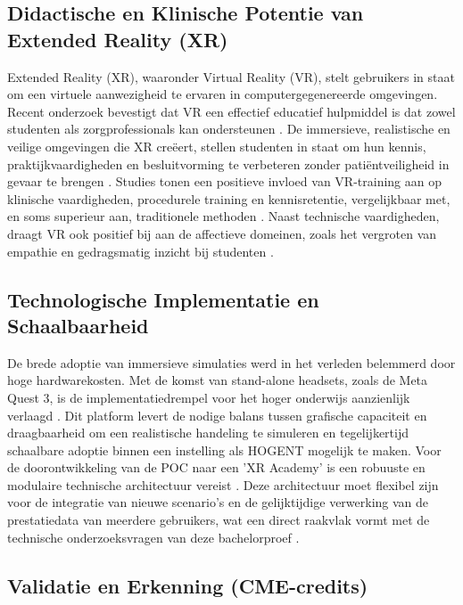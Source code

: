 \subsection{Didactische en Klinische Potentie van Extended Reality (XR)}

Extended Reality (XR), waaronder Virtual Reality (VR), stelt gebruikers in staat om een virtuele aanwezigheid te ervaren in computergegenereerde omgevingen. Recent onderzoek bevestigt dat VR een effectief educatief hulpmiddel is dat zowel studenten als zorgprofessionals kan ondersteunen \autocite{Lampropoulos2025}. De immersieve, realistische en veilige omgevingen die XR creëert, stellen studenten in staat om hun kennis, praktijkvaardigheden en besluitvorming te verbeteren zonder patiëntveiligheid in gevaar te brengen \autocite{Lampropoulos2025}. Studies tonen een positieve invloed van VR-training aan op klinische vaardigheden, procedurele training en kennisretentie, vergelijkbaar met, en soms superieur aan, traditionele methoden \autocite{Kyaw2019}. Naast technische vaardigheden, draagt VR ook positief bij aan de affectieve domeinen, zoals het vergroten van empathie en gedragsmatig inzicht bij studenten \autocite{Lampropoulos2025}. 

\subsection{Technologische Implementatie en Schaalbaarheid}

De brede adoptie van immersieve simulaties werd in het verleden belemmerd door hoge hardwarekosten. Met de komst van stand-alone headsets, zoals de Meta Quest 3, is de implementatiedrempel voor het hoger onderwijs aanzienlijk verlaagd \autocite{Pottle2019}. Dit platform levert de nodige balans tussen grafische capaciteit en draagbaarheid om een realistische handeling te simuleren en tegelijkertijd schaalbare adoptie binnen een instelling als HOGENT mogelijk te maken. Voor de doorontwikkeling van de POC naar een 'XR Academy' is een robuuste en modulaire technische architectuur vereist \autocite{Radianti2020}. Deze architectuur moet flexibel zijn voor de integratie van nieuwe scenario's en de gelijktijdige verwerking van de prestatiedata van meerdere gebruikers, wat een direct raakvlak vormt met de technische onderzoeksvragen van deze bachelorproef \autocite{Hung2024}.

\subsection{Validatie en Erkenning (CME-credits)}

